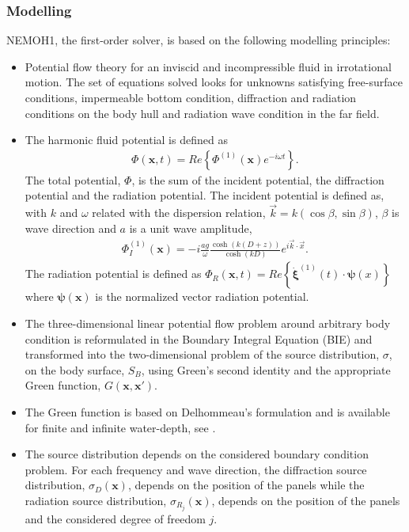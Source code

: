 \documentclass[12pt,a4paper,titlepage]{article}
\newcommand{\bs}{\boldsymbol}
\begin{document}
\subsubsection*{Modelling}
NEMOH1, the first-order solver, is based on the following modelling principles:
\begin{itemize}
\item Potential flow theory for an inviscid and incompressible fluid in irrotational motion. The set of equations solved looks for unknowns satisfying free-surface conditions, impermeable bottom condition, diffraction and radiation conditions on the body hull and radiation wave condition in the far field.
\item The harmonic fluid potential is defined as
\begin{align}\label{Eq:PhiHarm}
\Phi(\bs x,t)=Re\left\lbrace\Phi^{(1)}(\bs x)e^{-i\omega t}\right\rbrace.
\end{align}
The total potential, $\Phi$, is the sum of the incident potential, the diffraction potential and the radiation potential. 
The incident potential is defined as, with $k$ and $\omega$ related with the dispersion relation, $\vec{k}=k(\cos \beta,\sin \beta)$, $\beta$ is wave direction and $a$ is a unit wave amplitude, 
\begin{align}\label{Eq:PhiI}
\Phi_{I}^{(1)}(\bs x)=-i\frac{a g}{\omega}\frac{\cosh(k(D+z))}{\cosh(kD)} e^{i\vec{k}\cdot \vec{x}}.
\end{align}
The radiation potential is defined as $\Phi_R(\bs x,t)=Re\left\lbrace \dot{\bs \xi}^{(1)}(t) \cdot \bs \psi(x)\right\rbrace$ where $\bs \psi(\bs x)$ is the normalized vector radiation potential.

\item The three-dimensional linear potential flow problem around arbitrary body condition is reformulated in the Boundary Integral Equation (BIE) and transformed into the two-dimensional problem of the source distribution, $\sigma$, on the body surface, $S_B$, using Green's second identity and the appropriate Green function, $G(\bs x,\bs x')$. 
\item The Green function is based on Delhommeau's formulation and is available for finite and infinite water-depth, see \cite{Delhommeau}.
\item The source distribution depends on the considered boundary condition problem. For each frequency and wave direction, the diffraction source distribution, $\sigma_D(\bs x)$, depends on the position of the panels while the radiation source distribution, $\sigma_{R_j}(\bs x)$,  depends on the position of the panels and the considered degree of freedom $j$.


\end{itemize}
\end{document}
